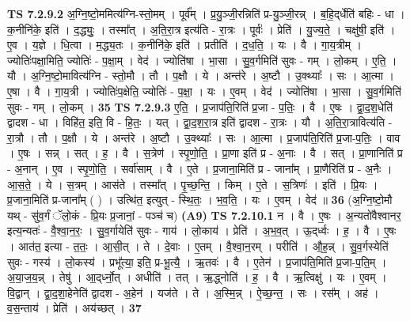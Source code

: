 \documentclass[17pt]{extarticle}
\begin{document}
                  \newline
                                \textbf{ TS 7.2.9.2} \newline
                  अ॒ग्नि॒ष्टो॒ममित्य॑ग्नि-स्तो॒मम् । पूर्व᳚म् । प्र॒यु॒ञ्जी॒रन्निति॑ प्र-यु॒ञ्जी॒रन्न् । ब॒हि॒द्‌र्धेति॑ बहिः - धा । क॒नीनि॑के॒ इति॑ । द॒द्ध्युः॒ । तस्मा᳚त् । अ॒ति॒रा॒त्र इत्य॑ति - रा॒त्रः । पूर्वः॑ । प्रेति॑ । यु॒ज्य॒ते॒ । चक्षु॑षी॒ इति॑ । ए॒व । य॒ज्ञे । धि॒त्वा । म॒द्ध्य॒तः । क॒नीनि॑के॒ इति॑ । प्रतीति॑ । द॒ध॒ति॒ । यः । वै । गा॒य॒त्रीम् । ज्योतिः॑पक्षा॒मिति॒ ज्योतिः॑ - प॒क्षा॒म् । वेद॑ । ज्योति॑षा । भा॒सा । सु॒व॒र्गमिति॑ सुवः - गम् । लो॒कम् । ए॒ति॒ । यौ । अ॒ग्नि॒ष्टो॒मावित्य॑ग्नि - स्तो॒मौ । तौ । प॒क्षौ । ये । अन्त॑रे । अ॒ष्टौ । उ॒क्थ्याः᳚ । सः । आ॒त्मा । ए॒षा । वै । गा॒य॒त्री । ज्योतिः॑प॒क्षेति॒ ज्योतिः॑ - प॒क्षा॒ । यः । ए॒वम् । वेद॑ । ज्योति॑षा । भा॒सा । सु॒व॒र्गमिति॑ सुवः - गम् । लो॒कम् । \textbf{  35} \newline
                  \newline
                                \textbf{ TS 7.2.9.3} \newline
                  ए॒ति॒ । प्र॒जाप॑ति॒रिति॑ प्र॒जा - प॒तिः॒ । वै । ए॒षः । द्वा॒द॒श॒धेति॑ द्वादश - धा । विहि॑त॒ इति॒ वि - हि॒तः॒ । यत् । द्वा॒द॒श॒रा॒त्र इति॑ द्वादश - रा॒त्रः । यौ । अ॒ति॒रा॒त्रावित्य॑ति - रा॒त्रौ । तौ । प॒क्षौ । ये । अन्त॑रे । अ॒ष्टौ । उ॒क्थ्याः᳚ । सः । आ॒त्मा । प्र॒जाप॑ति॒रिति॑ प्र॒जा-प॒तिः॒ । वाव । ए॒षः । सन्न् । सत् । ह॒ । वै । स॒त्रेण॑ । स्पृ॒णो॒ति॒ । प्रा॒णा इति॑ प्र - अ॒नाः । वै । सत् । प्रा॒णानिति॑ प्र - अ॒नान् । ए॒व । स्पृ॒णो॒ति॒ । सर्वा॑साम् । वै । ए॒ते । प्र॒जाना॒मिति॑ प्र - जाना᳚म् । प्रा॒णैरिति॑ प्र - अ॒नैः । आ॒स॒ते॒ । ये । स॒त्रम् । आस॑ते । तस्मा᳚त् । पृ॒च्छ॒न्ति॒ । किम् । ए॒ते । स॒त्रिणः॑ । इति॑ । प्रि॒यः । प्र॒जाना॒मिति॑ प्र-जाना᳚म् ( ) । उत्थि॑त॒ इत्युत् - स्थि॒तः॒ । भ॒व॒ति॒ । यः । ए॒वम् । वेद॑ ॥ \textbf{  36} \newline
                  \newline
                      (अ॒ग्नि॒ष्टो॒मौ यथ् - सु॑व॒र्गं ॅलो॒कं - प्रि॒यः प्र॒जानां॒ - पञ्च॑ च)  \textbf{(A9)} \newline \newline
                                \textbf{ TS 7.2.10.1} \newline
                  न । वै । ए॒षः । अ॒न्यतो॑वैश्वानर॒ इत्य॒न्यतः॑ - वै॒श्वा॒न॒रः॒ । सु॒व॒र्गायेति॑ सुवः - गाय॑ । लो॒काय॑ । प्रेति॑ । अ॒भ॒व॒त् । ऊ॒द्‌र्ध्वः । ह॒ । वै । ए॒षः । आत॑त॒ इत्या - त॒तः॒ । आ॒सी॒त् । ते । दे॒वाः । ए॒तम् । वै॒श्वा॒न॒रम् । परीति॑ । औ॒ह॒न्न् । सु॒व॒र्गस्येति॑ सुवः - गस्य॑ । लो॒कस्य॑ । प्रभू᳚त्या॒ इति॒ प्र-भू॒त्यै॒ । ऋ॒तवः॑ । वै । ए॒तेन॑ । प्र॒जाप॑ति॒मिति॑ प्र॒जा-प॒ति॒म् । अ॒या॒ज॒य॒न्न् । तेषु॑ । आ॒द्‌र्ध्नो॒त् । अधीति॑ । तत् । ऋ॒द्ध्नोति॑ । ह॒ । वै । ऋ॒त्विक्षु॑ । यः । ए॒वम् । वि॒द्वान् । द्वा॒द॒शा॒हेनेति॑ द्वादश - अ॒हेन॑ । यज॑ते । ते । अ॒स्मि॒न्न् । ऐ॒च्छ॒न्त॒ । सः । रस᳚म् । अह॑ । व॒स॒न्ताय॑ । प्रेति॑ । अय॑च्छत् । \textbf{  37} \newline
\end{document}
